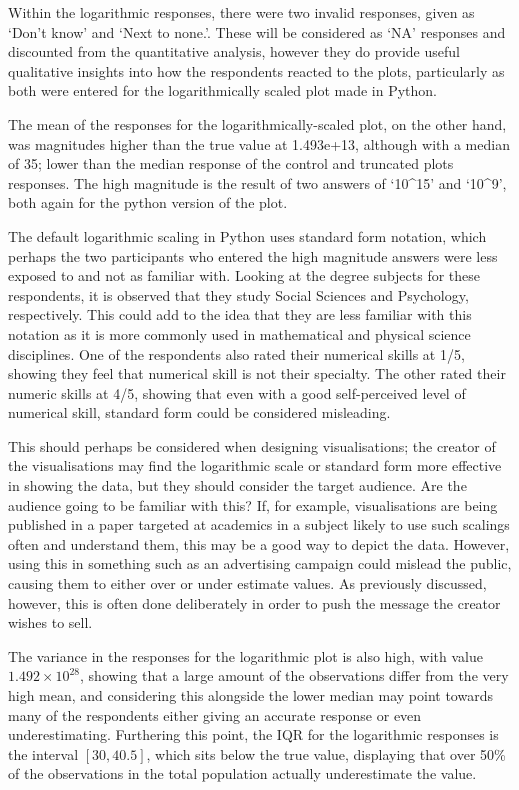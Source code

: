 \documentclass[
]{article}
\begin{document}
Within the logarithmic responses, there were two invalid responses,
given as `Don't know' and `Next to none.'. These will be considered as
`NA' responses and discounted from the quantitative analysis, however
they do provide useful qualitative insights into how the respondents
reacted to the plots, particularly as both were entered for the
logarithmically scaled plot made in Python.

The mean of the responses for the logarithmically-scaled plot, on the
other hand, was magnitudes higher than the true value at 1.493e+13,
although with a median of 35; lower than the median response of the
control and truncated plots responses. The high magnitude is the result
of two answers of `10\^{}15' and `10\^{}9', both again for the python
version of the plot.

The default logarithmic scaling in Python uses standard form notation,
which perhaps the two participants who entered the high magnitude
answers were less exposed to and not as familiar with. Looking at the
degree subjects for these respondents, it is observed that they study
Social Sciences and Psychology, respectively. This could add to the idea
that they are less familiar with this notation as it is more commonly
used in mathematical and physical science disciplines. One of the
respondents also rated their numerical skills at 1/5, showing they feel
that numerical skill is not their specialty. The other rated their
numeric skills at 4/5, showing that even with a good self-perceived
level of numerical skill, standard form could be considered misleading.

This should perhaps be considered when designing visualisations; the
creator of the visualisations may find the logarithmic scale or standard
form more effective in showing the data, but they should consider the
target audience. Are the audience going to be familiar with this? If,
for example, visualisations are being published in a paper targeted at
academics in a subject likely to use such scalings often and understand
them, this may be a good way to depict the data. However, using this in
something such as an advertising campaign could mislead the public,
causing them to either over or under estimate values. As previously
discussed, however, this is often done deliberately in order to push the
message the creator wishes to sell.

The variance in the responses for the logarithmic plot is also high,
with value \(1.492 \times 10^{28}\), showing that a large amount of the
observations differ from the very high mean, and considering this
alongside the lower median may point towards many of the respondents
either giving an accurate response or even underestimating. Furthering
this point, the IQR for the logarithmic responses is the interval
\([30, 40.5]\), which sits below the true value, displaying that over
50\% of the observations in the total population actually underestimate
the value.
\end{document}
